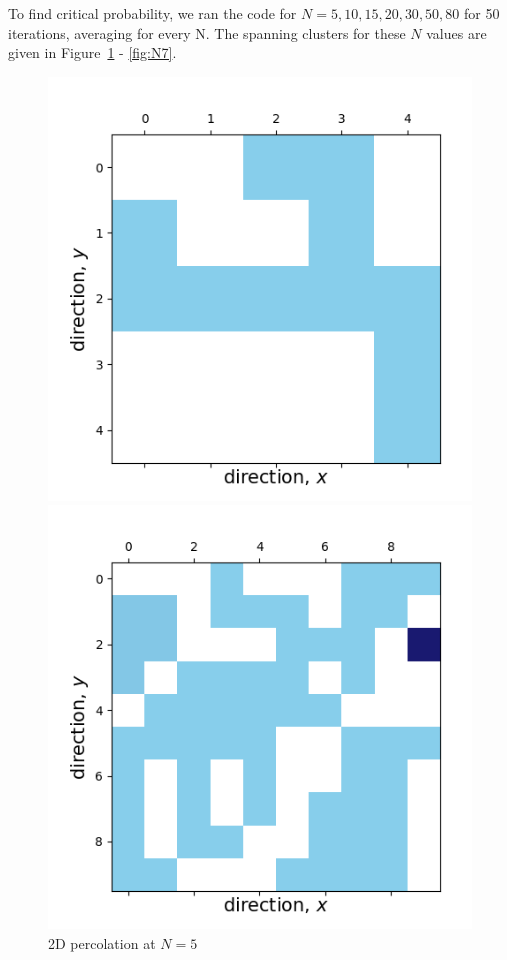 \documentclass[12pt]{article}
\begin{document}
To find critical probability, we ran the code for $N=5, 10, 15, 20, 30, 50, 80$ for 50 iterations, averaging for every N. The spanning clusters for these $N$ values are given in Figure~\ref{fig:N1} - \ref{fig:N7}.

\begin{figure}[!htb]
  \includegraphics[width=\linewidth]{percolation5.png}
  \caption{2D percolation at $N=5$}\label{fig:N1}
\endminipage\hfill
{}
\includegraphics[width=\linewidth]{percolation10.png}

\end{figure}
\end{document}
